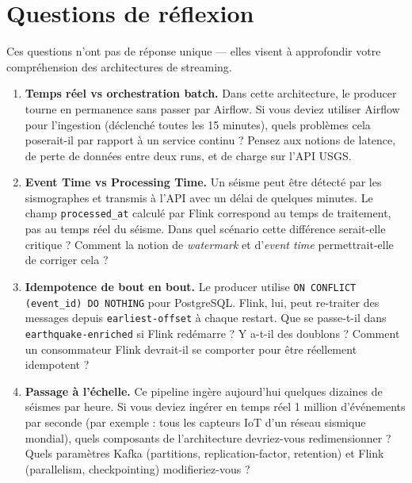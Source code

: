 \documentclass[12pt,a4paper]{article}
\begin{document}
\newpage

\section*{Questions de réflexion}

Ces questions n'ont pas de réponse unique --- elles visent à approfondir
votre compréhension des architectures de streaming.

\begin{enumerate}[label=\textbf{R\arabic*.}]

  \item \textbf{Temps réel vs orchestration batch.}
        Dans cette architecture, le producer tourne en permanence sans passer par Airflow.
        Si vous deviez utiliser Airflow pour l'ingestion (déclenché toutes les 15 minutes),
        quels problèmes cela poserait-il par rapport à un service continu ?
        Pensez aux notions de latence, de perte de données entre deux runs,
        et de charge sur l'API USGS.

  \item \textbf{Event Time vs Processing Time.}
        Un séisme peut être détecté par les sismographes et transmis à l'API
        avec un délai de quelques minutes.
        Le champ \texttt{processed\_at} calculé par Flink correspond au temps de traitement,
        pas au temps réel du séisme. Dans quel scénario cette différence serait-elle critique ?
        Comment la notion de \textit{watermark} et d'\textit{event time} permettrait-elle
        de corriger cela ?

  \item \textbf{Idempotence de bout en bout.}
        Le producer utilise \texttt{ON CONFLICT (event\_id) DO NOTHING} pour PostgreSQL.
        Flink, lui, peut re-traiter des messages depuis \texttt{earliest-offset} à chaque restart.
        Que se passe-t-il dans \texttt{earthquake-enriched} si Flink redémarre ?
        Y a-t-il des doublons ? Comment un consommateur Flink devrait-il se comporter
        pour être réellement idempotent ?

  \item \textbf{Passage à l'échelle.}
        Ce pipeline ingère aujourd'hui quelques dizaines de séismes par heure.
        Si vous deviez ingérer en temps réel 1 million d'événements par seconde
        (par exemple : tous les capteurs IoT d'un réseau sismique mondial),
        quels composants de l'architecture devriez-vous redimensionner ?
        Quels paramètres Kafka (partitions, replication-factor, retention)
        et Flink (parallelism, checkpointing) modifieriez-vous ?

\end{enumerate}
\end{document}

